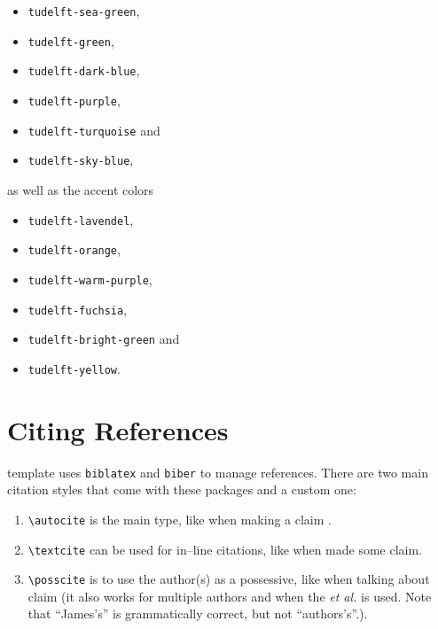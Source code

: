 \begin{itemize}
\itemsep 0pt
\parskip 0pt
\item\texttt{\color{tudelft-sea-green}tudelft-sea-green},
\item\texttt{\color{tudelft-green}tudelft-green},
\item\texttt{\color{tudelft-dark-blue}tudelft-dark-blue},
\item\texttt{\color{tudelft-purple}tudelft-purple},
\item\texttt{\color{tudelft-turquoise}tudelft-turquoise} and
\item\texttt{\color{tudelft-sky-blue}tudelft-sky-blue},
\end{itemize}
as well as the accent colors
\begin{itemize}
\itemsep 0pt
\parskip 0pt
\item\texttt{\color{tudelft-lavendel}tudelft-lavendel},
\item\texttt{\color{tudelft-orange}tudelft-orange},
\item\texttt{\color{tudelft-warm-purple}tudelft-warm-purple},
\item\texttt{\color{tudelft-fuchsia}tudelft-fuchsia},
\item\texttt{\color{tudelft-bright-green}tudelft-bright-green} and
\item\texttt{\color{tudelft-yellow}tudelft-yellow}.
\end{itemize}

\section{Citing References}
 template uses \texttt{biblatex} and \texttt{biber} to manage references. There are two main citation styles that come with these packages and a custom one:

\begin{enumerate}
    \item \texttt{\backslash autocite} is the main type, like when making a claim \autocite{Einstein1906}.
    \item \texttt{\backslash textcite} can be used for in--line citations, like when \textcite{Einstein1906} made some claim.
    \item \texttt{\backslash posscite} is to use the author(s) as a possessive, like when talking about  claim (it also works for multiple authors and when the \textit{et al.} is used. Note that ``James's'' is grammatically correct, but not ``authors's''.).
\end{enumerate}

\newpage
\printbibliography[heading=subbibnumbered, segment=\therefsegment]